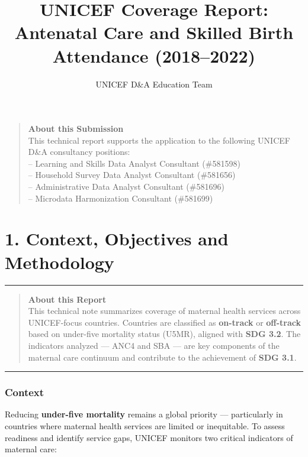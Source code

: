 \documentclass[
]{article}
\title{UNICEF Coverage Report: Antenatal Care and Skilled Birth
Attendance (2018--2022)}
\author{UNICEF D\&A Education Team}
\date{}
\begin{document}
\maketitle

\begin{quote}
\textbf{About this Submission}\\
This technical report supports the application to the following UNICEF
D\&A consultancy positions:\\
-- Learning and Skills Data Analyst Consultant (\#581598)\\
-- Household Survey Data Analyst Consultant (\#581656)\\
-- Administrative Data Analyst Consultant (\#581696)\\
-- Microdata Harmonization Consultant (\#581699)
\end{quote}

\section{1. Context, Objectives and
Methodology}\label{context-objectives-and-methodology}

\begin{center}\rule{0.5\linewidth}{0.5pt}\end{center}

\begin{quote}
\textbf{About this Report}\\
This technical note summarizes coverage of maternal health services
across UNICEF-focus countries. Countries are classified as
\textbf{on-track} or \textbf{off-track} based on under-five mortality
status (U5MR), aligned with \textbf{SDG 3.2}. The indicators analyzed
--- ANC4 and SBA --- are key components of the maternal care continuum
and contribute to the achievement of \textbf{SDG 3.1}.
\end{quote}

\begin{center}\rule{0.5\linewidth}{0.5pt}\end{center}

\subsubsection{Context}\label{context}

Reducing \textbf{under-five mortality} remains a global priority ---
particularly in countries where maternal health services are limited or
inequitable. To assess readiness and identify service gaps, UNICEF
monitors two critical indicators of maternal care:
\end{document}
